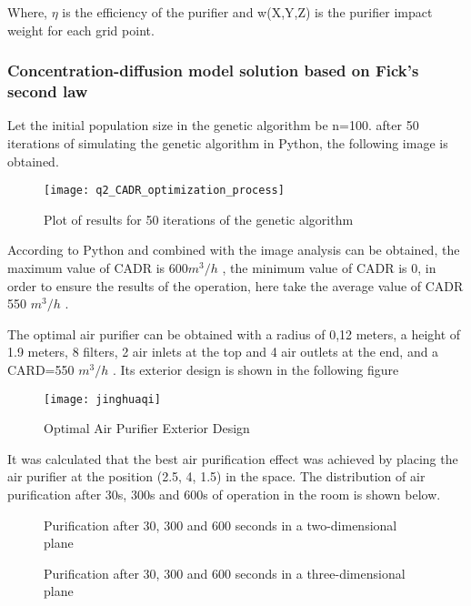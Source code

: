 \documentclass{apmcmthesis}
\begin{document}
Where, $\eta $ is the efficiency of the purifier and w(X,Y,Z) is the purifier impact weight for each grid point.

\subsubsection{Concentration-diffusion model solution based on Fick's second law}
Let the initial population size in the genetic algorithm be n=100. after 50 iterations of simulating the genetic algorithm in Python, the following image is obtained.
\begin{figure}[H]
	\centering
	\texttt{[image: q2\_CADR\_optimization\_process]}%
	\caption{Plot of results for 50 iterations of the genetic algorithm} %
\end{figure}

According to Python and combined with the image analysis can be obtained, the maximum value of CADR is 600${m^3}/h$ , the minimum value of CADR is 0, in order to ensure the results of the operation, here take the average value of CADR 550 ${m^3}/h$ .

The optimal air purifier can be obtained with a radius of 0,12 meters, a height of 1.9 meters, 8 filters, 2 air inlets at the top and 4 air outlets at the end, and a CARD=550 
${m^3}/h$ . Its exterior design is shown in the following figure
\begin{figure}[H]
	\centering
	\texttt{[image: jinghuaqi]}%
	\caption{Optimal Air Purifier Exterior Design } %
\end{figure}

It was calculated that the best air purification effect was achieved by placing the air purifier at the position (2.5, 4, 1.5) in the space. The distribution of air purification after 30s, 300s and 600s of operation in the room is shown below.
\begin{figure}[H]
	\centering    
	\caption{Purification after 30, 300 and 600 seconds in a two-dimensional plane}		%
\end{figure}
\begin{figure}[H]
	\centering    
	\caption{Purification after 30, 300 and 600 seconds in a three-dimensional plane}		%
\end{figure}
\end{document}
